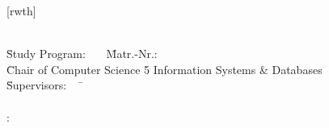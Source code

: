 \documentclass[aspectratio=169]{beamer}
\author[\firstname]{\firstname~\lastname~\email}
\institute[RWTH]{RWTH Aachen University}
\begin{document}
[rwth]{}
\begin{frame}[plain]
\titlepage

\parbox{0cm}{
  \vspace{-5.5em}
  \begin{tabbing}
    \=\textbf{\firstname~\lastname}\=\\[0.5em]
    \=Study Program: \studyProgram~~~\=Matr.-Nr.:\matrNo\\[0.5em]
    \=Chair of Computer Science 5 Information Systems \& Databases \=\\[0.5em]
    \={Supervisors}:~~~\=\firstsupervisor\\
    \>                 \>\secondsupervisor\\[0.5em]
    :       \>\firstadvisor\ifdefined\secondadvisor\\
    \>                 \>\secondadvisor\\[0.5em]
    \fi
  \end{tabbing}
}
\end{frame}



\end{document}
